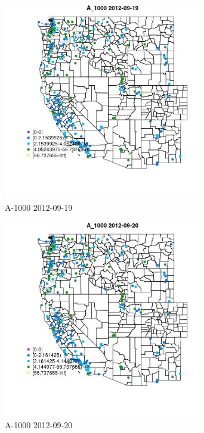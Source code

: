 \begin{figure} 
\centering  
\includegraphics[width=0.77\textwidth]{Code_Outputs/ML_input_report_ML_input_PM25_Step5_part_d_de_duplicated_aves_ML_input_MapObsA_10002012-09-19.jpg} 
\caption{\label{fig:ML_input_report_ML_input_PM25_Step5_part_d_de_duplicated_aves_ML_inputMapObsA_10002012-09-19}A-1000 2012-09-19} 
\end{figure} 
 

\begin{figure} 
\centering  
\includegraphics[width=0.77\textwidth]{Code_Outputs/ML_input_report_ML_input_PM25_Step5_part_d_de_duplicated_aves_ML_input_MapObsA_10002012-09-20.jpg} 
\caption{\label{fig:ML_input_report_ML_input_PM25_Step5_part_d_de_duplicated_aves_ML_inputMapObsA_10002012-09-20}A-1000 2012-09-20} 
\end{figure} 
 

